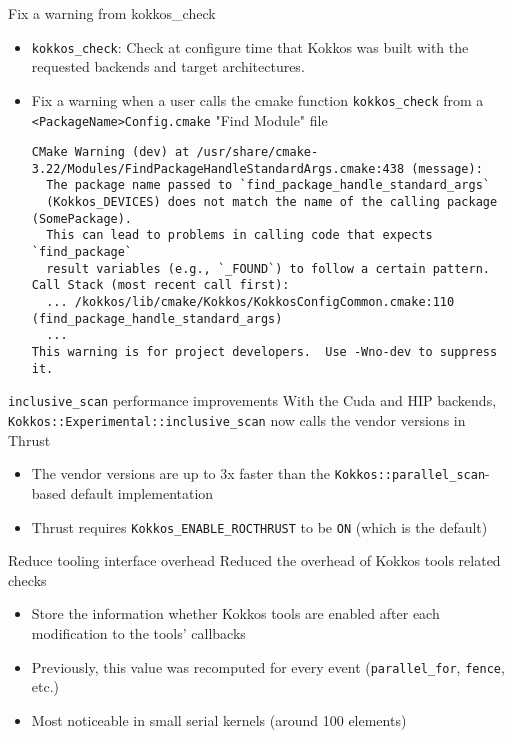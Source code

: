 \begin{frame}[fragile]{Fix a warning from kokkos\_check}
 \begin{itemize}
    \item \texttt{kokkos\_check}: Check at configure time that Kokkos was built with the requested backends and target architectures.
    \item Fix a warning when a user calls the cmake function \texttt{kokkos\_check} from a \texttt{<PackageName>Config.cmake} "Find Module" file
    {\tiny \begin{verbatim}
CMake Warning (dev) at /usr/share/cmake-3.22/Modules/FindPackageHandleStandardArgs.cmake:438 (message):
  The package name passed to `find_package_handle_standard_args`
  (Kokkos_DEVICES) does not match the name of the calling package (SomePackage).
  This can lead to problems in calling code that expects `find_package`
  result variables (e.g., `_FOUND`) to follow a certain pattern.
Call Stack (most recent call first):
  ... /kokkos/lib/cmake/Kokkos/KokkosConfigCommon.cmake:110 (find_package_handle_standard_args)
  ...
This warning is for project developers.  Use -Wno-dev to suppress it.
    \end{verbatim}}
 \end{itemize}
\end{frame}

\begin{frame}[fragile]{\texttt{inclusive\_scan} performance improvements}
  With the Cuda and HIP backends, \texttt{Kokkos::Experimental::inclusive\_scan} now calls the vendor versions in Thrust
  \begin{itemize}
     \item The vendor versions are up to 3x faster than the \texttt{Kokkos::parallel\_scan}-based default implementation
     \item Thrust requires \texttt{Kokkos\_ENABLE\_ROCTHRUST} to be \texttt{ON} (which is the default)
  \end{itemize}
\end{frame}

\begin{frame}[fragile]{Reduce tooling interface overhead}
  Reduced the overhead of Kokkos tools related checks
  \begin{itemize}
      \item Store the information whether Kokkos tools are enabled after each modification to the tools' callbacks
      \item Previously, this value was recomputed for every event (\texttt{parallel\_for}, \texttt{fence}, etc.)
      \item Most noticeable in small serial kernels (around 100 elements)
  \end{itemize}
\end{frame}

